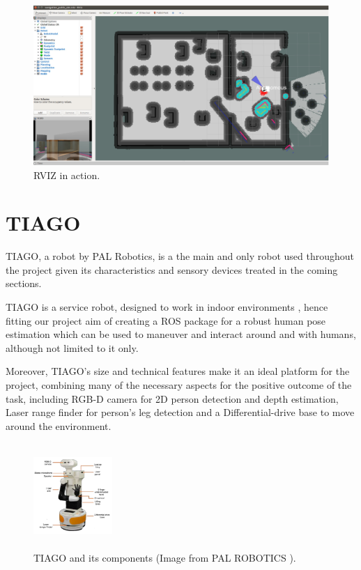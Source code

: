 \begin{figure}[!htbp]
\begin{center}
\includegraphics[width=\linewidth]{images/RVIZ_screenshot.png}
\end{center}
\caption{RVIZ in action.}
\label{fig:rviz_screenshot}
\end{figure}

\section{TIAGO}

TIAGO, a robot by PAL Robotics, is a the main and only robot used throughout the project given its characteristics and sensory devices treated in the coming sections. 

TIAGO is a service robot, designed to work in indoor environments \cite{website:TIAGo}, hence fitting our project aim of creating a ROS package for a robust human pose estimation which can be used to maneuver and interact around and with humans, although not limited to it only.

Moreover, TIAGO's size and technical features make it an ideal platform for the project, combining many of the necessary aspects for the positive outcome of the task, including RGB-D camera for 2D person detection and depth estimation, Laser range finder for person's leg detection and a Differential-drive base to move around the environment.

\begin{figure}[!htbp]
\begin{center}
\includegraphics[width=3cm,height=4cm,keepaspectratio]{images/tiago_components.png}
\end{center}
\caption{TIAGO and its components (Image from PAL ROBOTICS \cite{website:TIAGOWEBSITE}).}
\end{figure}

